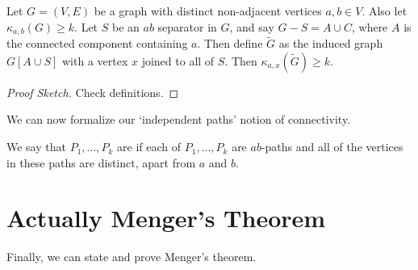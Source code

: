 \documentclass[a4paper]{scrreprt}
\begin{document}
\begin{lemma}
	Let $G = (V, E)$ be a graph with distinct non-adjacent vertices $a, b \in V$. Also let $\kappa_{a, b}(G) \geq k$. Let $S$ be an $ab$ separator in $G$, and say $G - S = A \cup C$, where $A$ is the connected component containing $a$. Then define $\tilde{G}$ as the induced graph $G[A \cup S]$ with a vertex $x$ joined to all of $S$. Then $\kappa_{a, x}(\tilde{G}) \geq k$.
\end{lemma}
\begin{proof}[Proof Sketch]
	Check definitions.
\end{proof}

We can now formalize our `independent paths' notion of connectivity.

\begin{definition}
	We say that $P_1, \dots, P_k$ are  if each of $P_1, \dots, P_k$ are $ab$-paths and all of the vertices in these paths are distinct, apart from $a$ and $b$.
\end{definition}

\section{Actually Menger's Theorem}

Finally, we can state and prove Menger's theorem.
\end{document}
